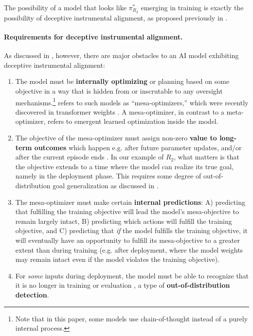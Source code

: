 \documentclass[11pt]{article}
\begin{document}
The possibility of a model that looks like $\pi^*_{R_2}$ emerging in training is exactly the possibility of deceptive instrumental alignment, as proposed previously in \cite{hubinger2019risks}.

\paragraph{Requirements for deceptive instrumental alignment.} As discussed in \citet{ngo2022alignment, hubinger2019risks}, however, there are major obstacles to an AI model exhibiting deceptive instrumental alignment:
\begin{enumerate}
    \item The model must be \textbf{internally optimizing} or planning based on some objective in a way that is hidden from or inscrutable to any oversight mechanisms.\footnote{Note that in this paper, some models use chain-of-thought instead of a purely internal process.} \citet{hubinger2019risks} refers to such models as ``mesa-optimizers,'' which were recently discovered in transformer weights \citep{von2023uncovering}. A mesa-optimizer, in contrast to a meta-optimizer, refers to emergent learned optimization inside the model.
    \item The objective of the mesa-optimizer must assign non-zero \textbf{value to long-term outcomes} which happen e.g. after future parameter updates, and/or after the current episode ends \citep{ngo2022alignment}. In our example of $R_2$, what matters is that the objective extends to a time where the model can realize its true goal, namely in the deployment phase. This requires some degree of out-of-distribution goal generalization as discussed in \citet{ngo2022alignment}.
    \item The mesa-optimizer must make certain \textbf{internal predictions}: A) predicting that fulfilling the training objective will lead the model's mesa-objective to remain largely intact, B) predicting which actions will fulfill the training objective, and C) predicting that \textit{if} the model fulfills the training objective, it will eventually have an opportunity to fulfill its mesa-objective to a greater extent than during training (e.g. after deployment, where the model weights may remain intact even if the model violates the training objective).
    \item For \textit{some} inputs during deployment, the model must be able to recognize that it is no longer in training or evaluation \citep[initial demonstrations shown in][]{laine2023towards, ngo2022alignment}, a type of \textbf{out-of-distribution detection}.

\end{enumerate}
\end{document}

